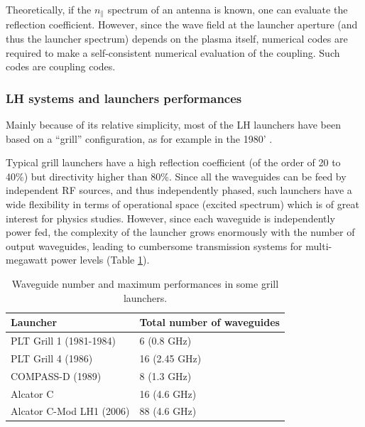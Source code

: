 Theoretically, if the $n_{\parallel}$ spectrum of an antenna is known, one can evaluate the reflection coefficient. However, since the wave field at the launcher aperture (and thus the launcher spectrum) depends on the plasma itself, numerical codes are required to make a self-consistent numerical evaluation of the coupling. Such codes are coupling codes.

\subsubsection{LH systems and launchers performances}
Mainly because of its relative simplicity, most of the LH launchers have been based on a “grill” configuration, as for example in the 1980' .

Typical grill launchers have a high reflection coefficient (of the order of 20 to 40\%) but directivity higher than 80\%. Since all the waveguides can be feed by independent RF sources, and thus independently phased, such launchers have a wide flexibility in terms of operational space (excited spectrum) which is of great interest for physics studies. However, since each waveguide is independently power fed, the complexity of the launcher grows enormously with the number of output waveguides, leading to cumbersome transmission systems for multi-megawatt power levels (Table \ref{tab:grillperformances}). 

\begin{table}
	{
		\begin{tabular}{| p{6cm} | p{5cm} |}
			\hline 
			Launcher & Total number of waveguides \\
			\hline \hline
			PLT Grill 1 (1981-1984)  \sidecite{Stevens1988} & 6 (0.8 GHz) \\
			\hline
			PLT Grill 4 (1986) \sidecite{Stevens1988} & 16 (2.45 GHz) \\
			\hline
			COMPASS-D (1989) & 8 (1.3 GHz) \\
			\hline
			Alcator C \sidecite{Porkolab1984a} & 16 (4.6 GHz) \\
			\hline
			Alcator C-Mod LH1 (2006) & 88 (4.6 GHz) \\
			\hline
		\end{tabular}
	}
	\caption{Waveguide number and maximum performances in some grill launchers.}
	\label{tab:grillperformances}
\end{table}

